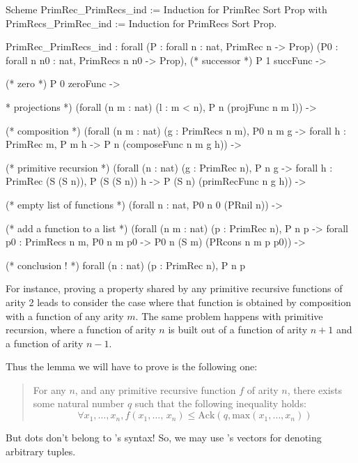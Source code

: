 \begin{Coqsrc}
Scheme PrimRec_PrimRecs_ind := Induction for PrimRec
  Sort Prop
  with PrimRecs_PrimRec_ind := Induction for PrimRecs 
  Sort Prop.
\end{Coqsrc}

\begin{Coqanswer}
PrimRec_PrimRecs_ind :
forall (P : forall n : nat, PrimRec n -> Prop)
  (P0 : forall n n0 : nat, PrimRecs n n0 -> Prop),
(* successor *)
P 1 succFunc ->

(* zero *)
P 0 zeroFunc ->

* projections *)
(forall (n m : nat) (l : m < n), P n (projFunc n m l)) ->

(* composition *) 
(forall (n m : nat) (g : PrimRecs n m),
      P0 n m g -> forall h : PrimRec m, P m h -> 
      P n (composeFunc n m g h)) ->

(* primitive recursion *)
(forall (n : nat) (g : PrimRec n),
 P n g ->
    forall h : PrimRec (S (S n)), P (S (S n)) h -> 
     P (S n) (primRecFunc n g h)) ->

(* empty list of functions *)
(forall n : nat, P0 n 0 (PRnil n)) ->

(* add a function to a list *)
(forall (n m : nat) (p : PrimRec n),
   P n p -> 
   forall p0 : PrimRecs n m, P0 n m p0 -> 
   P0 n (S m) (PRcons n m p p0)) ->

(* conclusion ! *)
forall (n : nat) (p : PrimRec n), P n p
\end{Coqanswer}

For instance, proving a property shared by any primitive recursive functions of arity 2 leads to consider the case where that function is obtained by composition with a function of any 
arity $m$. The same problem happens with primitive 
recursion, where a function of arity $n$ is built out of a function of arity $n+1$ and a function of arity $n-1$.

Thus the lemma we will have to prove is the following one:


  \begin{quote}
    For any $n$, and any primitive recursive function $f$ of  arity $n$, there exists some natural number $q$ such that the following inequality holds:
 \[
  \forall x_1,\dots,x_n, 
      f(x_1,\dots,\,x_n)\leq\textrm{Ack}(q,\textrm{max}(x_1,\dots,x_n))
\]
 \end{quote}


But dots don't belong to \gallina's syntax! So, we may use \coq's vectors for denoting arbitrary tuples.

